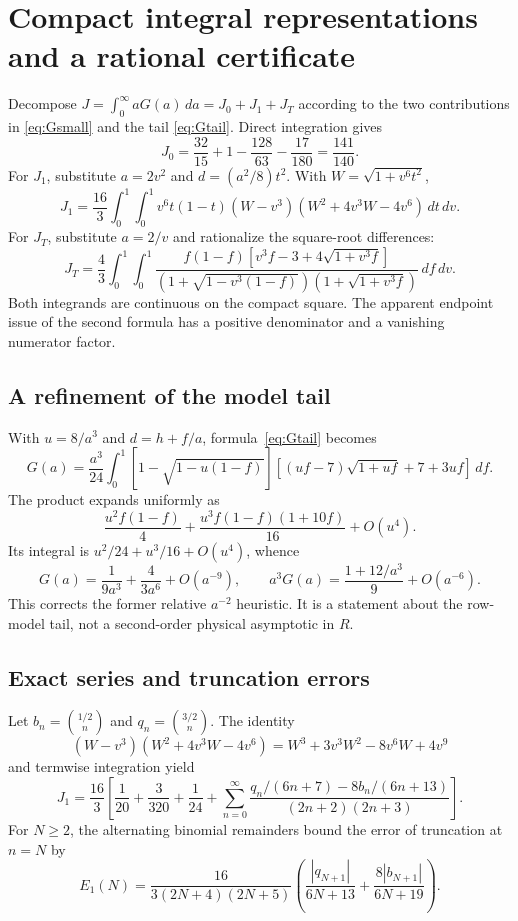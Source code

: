 \documentclass[11pt,a4paper]{article}
\theoremstyle{remark}\newtheorem{remark}{Remark}
\numberwithin{equation}{section}
\begin{document}
\section{Compact integral representations and a rational certificate}\label{sec:certificate}
Decompose $J=\int_0^\infty aG(a)\,da=J_0+J_1+J_T$ according to the two contributions in \eqref{eq:Gsmall} and the tail \eqref{eq:Gtail}. Direct integration gives
\[
 J_0=\frac{32}{15}+1-\frac{128}{63}-\frac{17}{180}=\frac{141}{140}.
\]
For $J_1$, substitute $a=2v^2$ and $d=(a^2/8)t^2$. With $W=\sqrt{1+v^6t^2}$,
\begin{equation}\label{eq:J1compact}
 J_1=\frac{16}{3}\int_0^1\int_0^1
 v^6t(1-t)(W-v^3)(W^2+4v^3W-4v^6)\,dt\,dv.
\end{equation}
For $J_T$, substitute $a=2/v$ and rationalize the square-root differences:
\begin{equation}\label{eq:JTcompact}
 J_T=\frac43\int_0^1\int_0^1
 \frac{f(1-f)[v^3f-3+4\sqrt{1+v^3f}]}
 {(1+\sqrt{1-v^3(1-f)})(1+\sqrt{1+v^3f})}\,df\,dv.
\end{equation}
Both integrands are continuous on the compact square. The apparent endpoint issue of the second formula has a positive denominator and a vanishing numerator factor.

\subsection{A refinement of the model tail}
With $u=8/a^3$ and $d=h+f/a$, formula~\eqref{eq:Gtail} becomes
\[
 G(a)=\frac{a^3}{24}\int_0^1[1-\sqrt{1-u(1-f)}]
       [(uf-7)\sqrt{1+uf}+7+3uf]\,df.
\]
The product expands uniformly as
\[
 \frac{u^2f(1-f)}4+\frac{u^3f(1-f)(1+10f)}{16}+O(u^4).
\]
Its integral is $u^2/24+u^3/16+O(u^4)$, whence
\begin{equation}\label{eq:tailasymp}
 G(a)=\frac1{9a^3}+\frac4{3a^6}+O(a^{-9}),\qquad
 a^3G(a)=\frac{1+12/a^3}{9}+O(a^{-6}).
\end{equation}
This corrects the former relative $a^{-2}$ heuristic. It is a statement about the row-model tail, not a second-order physical asymptotic in $R$.

\subsection{Exact series and truncation errors}
Let $b_n=\binom{1/2}{n}$ and $q_n=\binom{3/2}{n}$. The identity
\[
 (W-v^3)(W^2+4v^3W-4v^6)=W^3+3v^3W^2-8v^6W+4v^9
\]
and termwise integration yield
\begin{equation}\label{eq:J1series}
 J_1=\frac{16}{3}\left[\frac1{20}+\frac3{320}+\frac1{24}
 +\sum_{n=0}^{\infty}
 \frac{q_n/(6n+7)-8b_n/(6n+13)}{(2n+2)(2n+3)}\right].
\end{equation}
For $N\ge2$, the alternating binomial remainders bound the error of truncation at $n=N$ by
\begin{equation}\label{eq:E1}
 E_1(N)=\frac{16}{3(2N+4)(2N+5)}
 \left(\frac{|q_{N+1}|}{6N+13}+\frac{8|b_{N+1}|}{6N+19}\right).
\end{equation}
\end{document}
